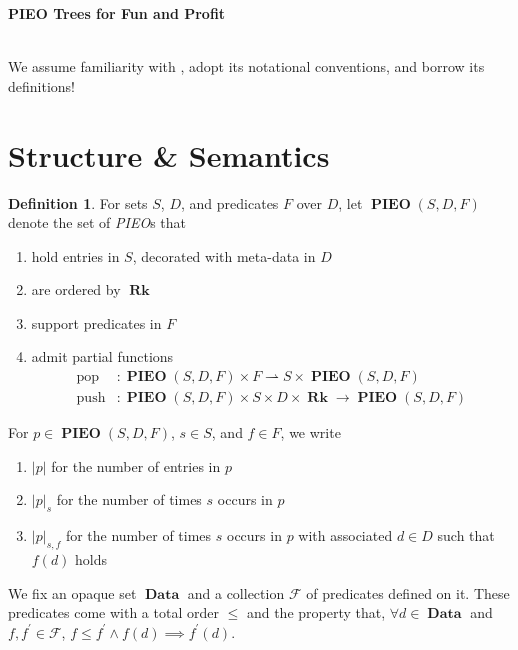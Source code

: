 \documentclass{amsart}
\DeclareMathOperator{\halfto}{\rightharpoonup}
\DeclareMathOperator{\push}{\mathrm{push}}
\DeclareMathOperator{\pop}{\mathrm{pop}}
\DeclareMathOperator{\Rk}{\mathbf{Rk}}
\DeclareMathOperator{\Data}{\mathbf{Data}}
\DeclareMathOperator{\PIEO}{\mathbf{PIEO}}
\theoremstyle{definition}
\newtheorem{dfn}[thm]{Definition}
\begin{document}
\pagestyle{empty}

{\LARGE \textbf{PIEO Trees for Fun and Profit}}

\hrulefill\\

We assume familiarity with \cite{OG}, adopt its notational conventions, and borrow its definitions!

\section{Structure \& Semantics}

\begin{dfn}
    For sets $S$, $D$, and predicates $F$ over $D$,
    let $\PIEO(S, D, F)$ denote the set of \emph{PIEO}s that
    \begin{enumerate}
        \item hold entries in $S$, decorated with meta-data in $D$
        \item are ordered by $\Rk$
        \item support predicates in $F$
        \item admit partial functions 
        \begin{align*}
            \pop &: \PIEO(S, D, F) \times F \halfto S \times \PIEO(S, D, F) \\
            \push &: \PIEO(S, D, F) \times S \times D \times \Rk \to \PIEO(S, D, F) 
        \end{align*}
    \end{enumerate}
    For $p \in \PIEO(S, D, F)$, $s \in S$, and $f \in F$, we write 
    \begin{enumerate}
        \item $|p|$ for the number of entries in $p$
        \item $|p|_{s}$ for the number of times $s$ occurs in $p$
        \item $|p|_{s,f}$ for the number of times $s$ occurs in $p$ with associated $d \in D$ such that $f(d)$ holds
    \end{enumerate}
\end{dfn}

We fix an opaque set $\Data$ and a collection $\mathcal F$ of predicates defined on it.
These predicates come with a total order $\leq$ and the property that, $\forall d \in \Data$ and $f,f^\prime \in \mathcal F$,
$f \leq f^\prime \land f(d) \implies f^\prime(d)$.
\end{document}
